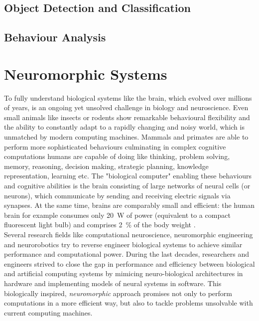 \subsection{Object Detection and Classification}
\label{subsec:obj_detect}
\subsection{Behaviour Analysis}
\label{subsec:behav_analysis}
\section{Neuromorphic Systems}
To fully understand biological systems like the brain, which evolved over millions of years, is an ongoing yet unsolved challenge in biology and neuroscience.
Even small animals like insects or rodents show remarkable behavioural flexibility and the ability to constantly adapt to a rapidly changing and noisy world, which is unmatched by modern computing machines.
Mammals and primates are able to perform more sophisticated behaviours culminating in complex cognitive computations humans are capable of doing like thinking, problem solving, memory, reasoning, decision making, strategic planning, knowledge representation, learning etc.
The "biological computer" enabling these behaviours and cognitive abilities is the brain consisting of large networks of neural cells (or neurons), which communicate by sending and receiving electric signals via synapses.
At the same time, brains are comparably small and efficient: the human brain for example consumes only \SI{20}{\watt} of power (equivalent to a compact fluorescent light bulb) and comprises \SI{2}{\percent} of the body weight \cite[Chap. 2.1]{Eliasmith2013}. \\
Several research fields like computational neuroscience, neuromorphic engineering and neurorobotics try to reverse engineer biological systems to achieve similar performance and computational power.
During the last decades, researchers and engineers strived to close the gap in performance and efficiency between biological and artificial computing systems by mimicing neuro-biological architectures in hardware and implementing models of neural systems in software.
This biologically inspired, \textit{neuromorphic} approach promises not only to perform computations in a more efficient way, but also to tackle problems unsolvable with current computing machines.
